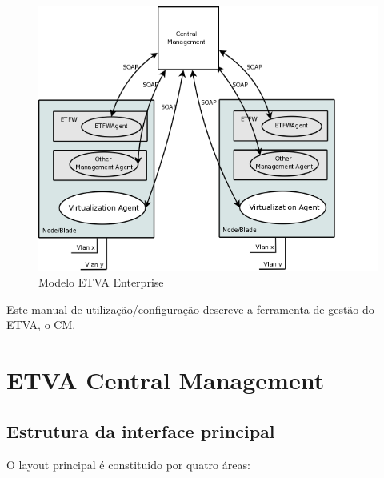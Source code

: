 \begin{description}
\begin{figure}[H]
\begin{center}
			\includegraphics[scale=0.6]{screenshots/etva_enterprise.png}
			\caption{Modelo ETVA Enterprise}
			\label{fig:etva_enterprise}
			\end{center}
		\end{figure}
\end{description}
 
Este manual de utilização/configuração descreve a ferramenta de gestão do ETVA, o \textsf{CM}.

\pagebreak

\chapter{\textsf{ETVA Central Management}}

\section{Estrutura da interface principal}
O layout principal é constituido por quatro áreas:

